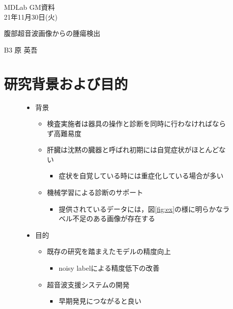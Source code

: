 \documentclass[a4j]{ujarticle}
\newcommand{\Fref}[1]{\mbox{図\ref{fig:#1}}}
\begin{document}
	\begin{flushright}
		MDLab GM資料\\
		21年11月30日(火)
	\end{flushright}

	\begin{center}
		{\Large	腹部超音波画像からの腫瘍検出}
	\end{center}

	\begin{flushright}
		{\large B3  原 英吾}\\
	\end{flushright}

	\section{研究背景および目的}
		\begin{figure}[h]
			\begin{minipage}{.59\textwidth}
				\begin{itemize}
					\item 背景
					\begin{itemize}
						\item 検査実施者は器具の操作と診断を同時に行わなければならず高難易度
						\item 肝臓は沈黙の臓器と呼ばれ初期には自覚症状がほとんどない
						\begin{itemize}
							\item 症状を自覚している時には重症化している場合が多い
						\end{itemize}
						\item 機械学習による診断のサポート
						\begin{itemize}
							\item 提供されているデータには，\Fref{ex}の様に明らかなラベル不足のある画像が存在する
						\end{itemize}
					\end{itemize}
					\item 目的
					\begin{itemize}
						\item 既存の研究を踏まえたモデルの精度向上
						\begin{itemize}
							\item noisy label\footnotemark[1]による精度低下の改善
						\end{itemize}
						\item 超音波支援システムの開発
						\begin{itemize}
							\item 早期発見につながると良い

\end{itemize}
\end{itemize}
\end{itemize}
\end{minipage}
\end{figure}
\end{document}
